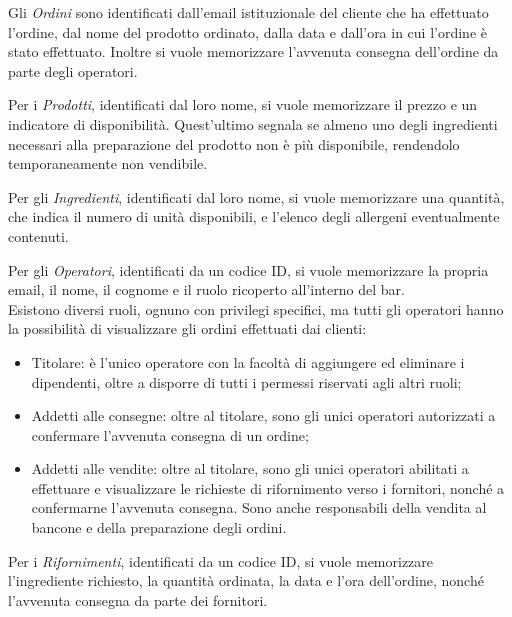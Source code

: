 \documentclass[12pt,a4paper]{article}
\begin{document}
    \vspace{8pt}
    \noindent
    Gli \textit{Ordini} sono identificati dall'email istituzionale del cliente che ha effettuato l'ordine, dal nome del prodotto ordinato, dalla data e dall'ora in cui l'ordine è stato effettuato. Inoltre si vuole memorizzare l'avvenuta consegna dell'ordine da parte degli operatori.
    
    \vspace{8pt}
    \noindent
    Per i \textit{Prodotti}, identificati dal loro nome, si vuole memorizzare il prezzo e un indicatore di disponibilità. Quest'ultimo segnala se almeno uno degli ingredienti necessari alla preparazione del prodotto non è più disponibile, rendendolo temporaneamente non vendibile.

    \vspace{8pt}
    \noindent
    Per gli \textit{Ingredienti},  identificati dal loro nome, si vuole memorizzare una quantità, che indica il numero di unità disponibili, e l'elenco degli allergeni eventualmente contenuti.

    \vspace{8pt}
    \noindent
    Per gli \textit{Operatori}, identificati da un codice ID, si vuole memorizzare la propria email, il nome, il cognome e il ruolo ricoperto all'interno del bar.\\
    Esistono diversi ruoli, ognuno con privilegi specifici, ma tutti gli operatori hanno la possibilità di visualizzare gli ordini effettuati dai clienti:
    \begin{itemize}[leftmargin=1em]
        \item Titolare: è l'unico operatore con la facoltà di aggiungere ed eliminare i dipendenti, oltre a disporre di tutti i permessi riservati agli altri ruoli;
        \item Addetti alle consegne: oltre al titolare, sono gli unici operatori autorizzati a confermare l'avvenuta consegna di un ordine;
        \item Addetti alle vendite: oltre al titolare, sono gli unici operatori abilitati a effettuare e visualizzare le richieste di rifornimento verso i fornitori, nonché a confermarne l'avvenuta consegna. Sono anche responsabili della vendita al bancone e della preparazione degli ordini.
    \end{itemize}

    \vspace{8pt}
    \noindent
    Per i \textit{Rifornimenti}, identificati da un codice ID, si vuole memorizzare l'ingrediente richiesto, la quantità ordinata, la data e l'ora dell'ordine, nonché l'avvenuta consegna da parte dei fornitori.
\end{document}
